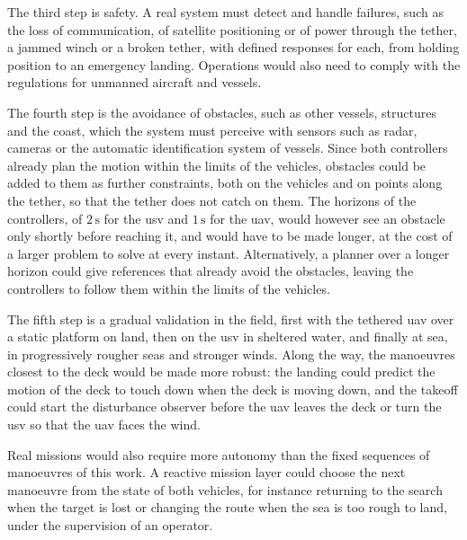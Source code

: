 The third step is safety. A real system must detect and handle failures, such as the loss of communication, of satellite positioning or of power through the tether, a jammed winch or a broken tether, with defined responses for each, from holding position to an emergency landing. Operations would also need to comply with the regulations for unmanned aircraft and vessels.

The fourth step is the avoidance of obstacles, such as other vessels, structures and the coast, which the system must perceive with sensors such as radar, cameras or the automatic identification system of vessels. Since both controllers already plan the motion within the limits of the vehicles, obstacles could be added to them as further constraints, both on the vehicles and on points along the tether, so that the tether does not catch on them. The horizons of the controllers, of $2\,\text{s}$ for the \gls{usv} and $1\,\text{s}$ for the \gls{uav}, would however see an obstacle only shortly before reaching it, and would have to be made longer, at the cost of a larger problem to solve at every instant. Alternatively, a planner over a longer horizon could give references that already avoid the obstacles, leaving the controllers to follow them within the limits of the vehicles.

The fifth step is a gradual validation in the field, first with the tethered \gls{uav} over a static platform on land, then on the \gls{usv} in sheltered water, and finally at sea, in progressively rougher seas and stronger winds. Along the way, the manoeuvres closest to the deck would be made more robust: the landing could predict the motion of the deck to touch down when the deck is moving down, and the takeoff could start the disturbance observer before the \gls{uav} leaves the deck or turn the \gls{usv} so that the \gls{uav} faces the wind.

Real missions would also require more autonomy than the fixed sequences of manoeuvres of this work. A reactive mission layer could choose the next manoeuvre from the state of both vehicles, for instance returning to the search when the target is lost or changing the route when the sea is too rough to land, under the supervision of an operator.
